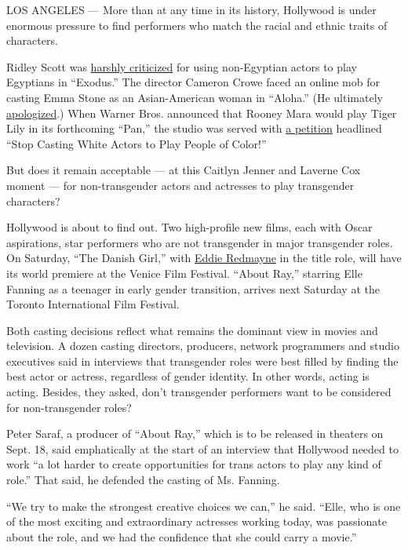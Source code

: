 LOS ANGELES --- More than at any time in its history, Hollywood is under
enormous pressure to find performers who match the racial and ethnic
traits of characters.

Ridley Scott was
\href{http://mashable.com/2014/12/11/exodus-movie-racist/}{harshly
criticized} for using non-Egyptian actors to play Egyptians in
``Exodus.'' The director Cameron Crowe faced an online mob for casting
Emma Stone as an Asian-American woman in ``Aloha.'' (He ultimately
\href{http://artsbeat.blogs.nytimes3xbfgragh.onion/2015/06/03/emma-stone-as-asian-american-cameron-crowe-apologizes/?_r=0}{apologized}.)
When Warner Bros. announced that Rooney Mara would play Tiger Lily in
its forthcoming ``Pan,'' the studio was served with
\href{http://www.cinemablend.com/new/Online-Petition-Launched-Protest-Rooney-Mara-Casting-Pan-42175.html}{a
petition} headlined ``Stop Casting White Actors to Play People of
Color!''

But does it remain acceptable --- at this Caitlyn Jenner and Laverne Cox
moment --- for non-transgender actors and actresses to play transgender
characters?

Hollywood is about to find out. Two high-profile new films, each with
Oscar aspirations, star performers who are not transgender in major
transgender roles. On Saturday, ``The Danish Girl,'' with
\href{http://www.nytimes3xbfgragh.onion/2012/12/16/fashion/eddie-redmayne-of-les-miserables-the-talk-of-the-town.html}{Eddie
Redmayne} in the title role, will have its world premiere at the Venice
Film Festival. ``About Ray,'' starring Elle Fanning as a teenager in
early gender transition, arrives next Saturday at the Toronto
International Film Festival.

Both casting decisions reflect what remains the dominant view in movies
and television. A dozen casting directors, producers, network
programmers and studio executives said in interviews that transgender
roles were best filled by finding the best actor or actress, regardless
of gender identity. In other words, acting is acting. Besides, they
asked, don't transgender performers want to be considered for
non-transgender roles?

Peter Saraf, a producer of ``About Ray,'' which is to be released in
theaters on Sept. 18, said emphatically at the start of an interview
that Hollywood needed to work ``a lot harder to create opportunities for
trans actors to play any kind of role.'' That said, he defended the
casting of Ms. Fanning.

``We try to make the strongest creative choices we can,'' he said.
``Elle, who is one of the most exciting and extraordinary actresses
working today, was passionate about the role, and we had the confidence
that she could carry a movie.''

